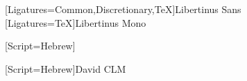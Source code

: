 \usepackage{pgfplots} %
\usepackage{pgfplotstable}
\usepackage{enumitem} %
\usepackage{booktabs} %
\usepackage{listings}
\usepackage{xcolor}

\pgfplotsset{compat=1.18} %
\usepackage{caption} %
\usepackage{mathrsfs,amsmath}   %
\usepackage[top=2cm,bottom=2cm,left=2.5cm,right=2cm]{geometry}
\usepackage{array} %
\usepackage{ragged2e} %
\usepackage{framed}


\usepackage[english, bidi=basic, layout=sectioning.tabular]{babel}
          [Ligatures={Common,Discretionary,TeX}]{Libertinus Sans}
          [Ligatures=TeX]{Libertinus Mono}


\setmainfont{David CLM}[Script=Hebrew]

[Script=Hebrew]{David CLM}
\usepackage{fontspec}

\newfontfamily{} %
\newfontfamily{}
\newfontfamily{} %
          

\newenvironment{solution}{\begin{proof}[Solution]}{\end{proof}}

\newcommand{\EN}{\selectlanguage{english}}
\newcommand{\HE}{\selectlanguage{hebrew} \vspace{0pt}}
\newcommand{\ToEn}[1]{\EN{#1}\HE}


